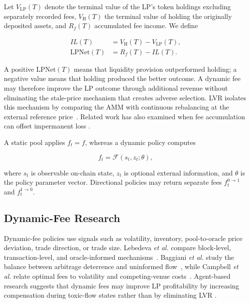 \documentclass[a4paper,conference]{IEEEtran}
\begin{document}
Let $V_{\mathrm{LP}}(T)$ denote the terminal value of the LP's token
holdings excluding separately recorded fees, $V_{\mathrm{H}}(T)$ the
terminal value of holding the originally deposited assets, and
$R_f(T)$ accumulated fee income. We define

\begin{align}
  IL(T)
  &=
  V_{\mathrm{H}}(T)-V_{\mathrm{LP}}(T),
  \label{eq:il}\\
  \mathrm{LPNet}(T)
  &=
  R_f(T)-IL(T).
  \label{eq:lpnet}
\end{align}

A positive $\mathrm{LPNet}(T)$ means that liquidity provision
outperformed holding; a negative value means that holding produced the
better outcome. A dynamic fee may therefore improve the LP outcome
through additional revenue without eliminating the stale-price
mechanism that creates adverse selection. LVR isolates this mechanism
by comparing the AMM with continuous rebalancing at the external
reference price~\cite{milionis2022lvr}. Related work has also examined
when fee accumulation can offset impermanent loss
\cite{melnikov2026impermanent_gain}.

A static pool applies $f_t=f$, whereas a dynamic policy computes

\begin{equation}
  f_t=\mathcal{F}(s_t,z_t;\theta),
  \label{eq:policy}
\end{equation}

where $s_t$ is observable on-chain state, $z_t$ is optional external
information, and $\theta$ is the policy parameter vector. Directional
policies may return separate fees $f_t^{0\rightarrow1}$ and
$f_t^{1\rightarrow0}$.

\subsection{Dynamic-Fee Research}

Dynamic-fee policies use signals such as volatility, inventory,
pool-to-oracle price deviation, trade direction, or trade size.
Lebedeva \emph{et al.} compare block-level, transaction-level, and
oracle-informed mechanisms~\cite{lebedeva2025dynamic}. Baggiani
\emph{et al.} study the balance between arbitrage deterrence and
uninformed flow~\cite{baggiani2025optimal}, while Campbell
\emph{et al.} relate optimal fees to volatility and competing-venue
costs~\cite{campbell2025optimal}. Agent-based research suggests that
dynamic fees may improve LP profitability by increasing compensation
during toxic-flow states rather than by eliminating LVR
\cite{dinosse2026dynamic}.
\end{document}
